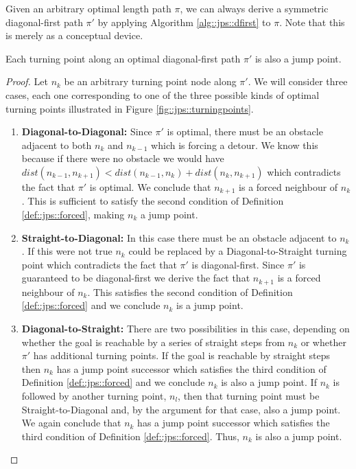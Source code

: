 Given an arbitrary optimal length path $\pi$, we can always derive a symmetric
diagonal-first path $\pi'$ by applying Algorithm \ref{alg::jps::dfirst} to $\pi$.
Note that this is merely as a conceptual device.



\begin{lemma}
\label{lemma::jps::turningpoints}
Each turning point along an optimal diagonal-first path $\pi'$ is also a jump point.
\end{lemma}
\begin{proof}
Let $n_{k}$ be an arbitrary turning point node along $\pi'$. 
We will consider three cases, each one corresponding to one of the three
possible kinds of optimal turning points illustrated in Figure \ref{fig::jps::turningpoints}. 

\begin{enumerate}
\item{
\textbf{Diagonal-to-Diagonal:} Since $\pi'$ is optimal, there must be an
obstacle adjacent to both $n_{k}$ and $n_{k-1}$ which is forcing a detour.
We know this because if there were no obstacle we would have 
$dist(n_{k-1}, n_{k+1}) < dist(n_{k-1}, n_{k}) + dist(n_{k}, n_{k+1})$ which contradicts
the fact that $\pi'$ is optimal.
We conclude that $n_{k+1}$ is a forced neighbour of $n_{k}$.
This is sufficient to satisfy the second condition of Definition
\ref{def::jps::forced}, making $n_{k}$ a jump point.
}

\item{
\textbf{Straight-to-Diagonal:} In this case there must be an 
obstacle adjacent to $n_{k}$. 
If this were not true $n_{k}$ could be replaced by a
Diagonal-to-Straight turning point which contradicts the fact that $\pi'$ is
diagonal-first.
Since $\pi'$ is guaranteed to be diagonal-first we derive the fact that $n_{k+1}$ is 
a forced neighbour of $n_{k}$.
This satisfies the second condition of Definition \ref{def::jps::forced} and we conclude
$n_{k}$ is a jump point.
}

\item{
\textbf{Diagonal-to-Straight:} There are two possibilities in this case, 
depending on whether the goal is reachable by a series of straight steps
from $n_{k}$ or whether $\pi'$ has additional turning points. If the goal
is reachable by straight steps then $n_{k}$ has a jump point successor which satisfies the
third condition of Definition \ref{def::jps::forced} and we conclude $n_{k}$ is
also a jump point.
If $n_{k}$ is followed by another turning point, $n_{l}$, then that turning
point must be Straight-to-Diagonal and, by the argument for that case, 
also a jump point.
We again conclude that $n_{k}$ has a jump point successor which satisfies
the third condition of Definition \ref{def::jps::forced}. Thus, $n_{k}$ is
also a jump point.
}
\end{enumerate}
\end{proof}


